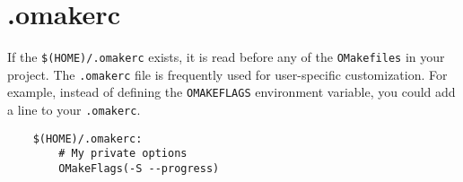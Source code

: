 \section{.omakerc}
\label{section:.omakerc}

If the \verb+$(HOME)/.omakerc+ exists, it is read before any of the \verb+OMakefiles+ in your
project.  The \verb+.omakerc+ file is frequently used for user-specific customization.
For example, instead of defining the \verb+OMAKEFLAGS+ environment variable, you could add
a line to your \verb+.omakerc+.

\begin{verbatim}
    $(HOME)/.omakerc:
        # My private options
        OMakeFlags(-S --progress)
\end{verbatim}    

